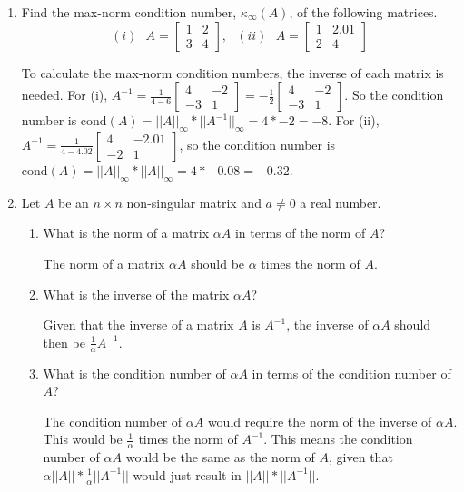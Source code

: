 \documentclass[10pt,letterpaper]{article}
\begin{document}
\begin{enumerate}
\item Find the max-norm condition number, $\kappa_{\infty}(A)$, of the following matrices.
$$(i)\ \ \ A = \begin{bmatrix}
1 & 2 \\
3 & 4 
\end{bmatrix},\ \ \ (ii)\ \ \ A = \begin{bmatrix}
1 & 2.01 \\
2 & 4 
\end{bmatrix}$$

\color{TangGreen}
To calculate the max-norm condition numbers, the inverse of each matrix is needed. For (i), $A^{-1} = \frac{1}{4 - 6}\begin{bmatrix}
4 & -2 \\
-3 & 1 
\end{bmatrix} = -\frac{1}{2}\begin{bmatrix}
4 & -2 \\
-3 & 1 
\end{bmatrix}$. So the condition number is $\text{cond}(A) = ||A||_{\infty} * ||A^{-1}||_{\infty} = 4 * -2 = -8$. For (ii), $A^{-1} = \frac{1}{4 - 4.02}\begin{bmatrix}
4 & -2.01 \\
-2 & 1 
\end{bmatrix}$, so the condition number is $\text{cond}(A) = ||A||_{\infty} * ||A||_{\infty} = 4 * -0.08 = -0.32$. 
\color{black}

\item Let $A$ be an $n \times n$ non-singular matrix and $a \neq 0$ a real number.

\begin{enumerate}

\item What is the norm of a matrix $\alpha A$ in terms of the norm of $A$?

\color{TangGreen}
The norm of a matrix $\alpha A$ should be $\alpha$ times the norm of $A$. 
\color{black}

\item What is the inverse of the matrix $\alpha A$?

\color{TangGreen}
Given that the inverse of a matrix $A$ is $A^{-1}$, the inverse of $\alpha A$ should then be $\frac{1}{\alpha} A^{-1}$. 
\color{black}

\item What is the condition number of $\alpha A$ in terms of the condition number of $A$?

\color{TangGreen}
The condition number of $\alpha A$ would require the norm of the inverse of $\alpha A$. This would be $\frac{1}{\alpha}$ times the norm of $A^{-1}$. This means the condition number of $\alpha A$ would be the same as the norm of $A$, given that $\alpha ||A|| * \frac{1}{\alpha} ||A^{-1}||$ would just result in $||A|| * ||A^{-1}||$. 
\color{black}


\end{enumerate}
\end{enumerate}
\end{document}
